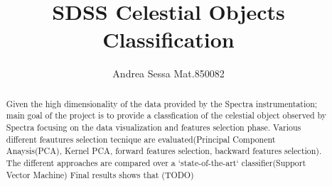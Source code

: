 \documentclass[a4paper,10pt]{article}
\title{SDSS Celestial Objects Classification}
\author{Andrea Sessa Mat.850082}
\begin{document}
\maketitle

\begin{abstract}
  Given the high dimensionality of the data provided by the Spectra instrumentation; main goal of the project
  is to provide a classfication of the celestial object observed by Spectra focusing on the data visualization 
  and features selection phase.\newline
  Various different feautures selection tecnique are evaluated(Principal Component Anaysis(PCA), Kernel PCA, forward features selection,
  backward features selection). The different approaches are compared over a `state-of-the-art` classifier(Support Vector Machine)\newline
  Final results shows that (TODO)
\end{abstract}

\newpage

\tableofcontents

\newpage

\listoffigures

\newpage
\end{document}
